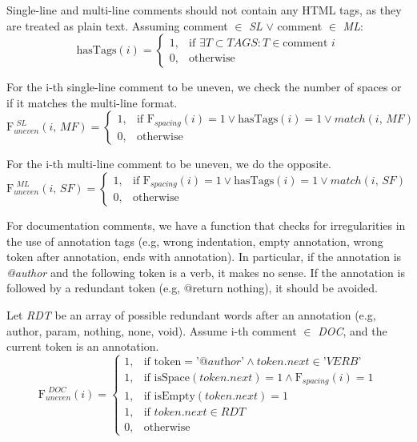 \noindent Single-line and multi-line comments should not contain any HTML tags, as they are treated as plain text.
Assuming comment $\in$ \textit{SL} $\vee$ comment $\in$ \textit{ML}:
\begin{equation*}
	\text{hasTags}(i) = \begin{cases}
		1, & \text{if } \exists T \subset TAGS : T \in \text{comment } \textit{i} \\
		0, & \text{otherwise}
	\end{cases}
\end{equation*}

\noindent For the i-th single-line comment to be uneven, we check the number of spaces or if it matches the multi-line format.
\begin{equation*}
	\mathrm{F}_{uneven}^{\textit{ SL}}(\textit{i, MF}) = \begin{cases}
		1, & \text{if } \mathrm{F}_{spacing}(i) = 1 \vee \text{hasTags}(i) = 1 \vee match(\textit{i, MF}) \\
		0, & \text{otherwise}
	\end{cases}
\end{equation*}

\noindent For the i-th multi-line comment to be uneven, we do the opposite.
\begin{equation*}
	\mathrm{F}_{uneven}^{\textit{ ML}}(\textit{i, SF}) = \begin{cases}
		1, & \text{if } \mathrm{F}_{spacing}(i) = 1 \vee \text{hasTags}(i) = 1 \vee match(\textit{i, SF}) \\
		0, & \text{otherwise}
	\end{cases}
\end{equation*}

\noindent For documentation comments, we have a function that checks for irregularities in the use of annotation tags (e.g, wrong indentation, empty annotation, wrong token after annotation, ends with annotation). In particular, if the annotation is \textit{@author} and the following token is a verb, it makes no sense. If the annotation is followed by a redundant token (e.g, @return nothing), it should be avoided.

\newpage

\noindent Let \textit{RDT} be an array of possible redundant words after an annotation (e.g, author, param, nothing, none, void).
Assume i-th comment $\in$ \textit{DOC}, and the current token is an annotation.
\begin{equation*}
	\mathrm{F}_{uneven}^{\textit{ DOC}}(i) = \begin{cases}
		1, & \text{if } \text{token} = \textit{'@author'} \wedge token.next \in \textit{'VERB'} \\
		1, & \text{if } \text{isSpace}(token.next) = 1 \wedge \mathrm{F}_{spacing}(i) = 1 \\
		1, & \text{if } \text{isEmpty}(token.next) = 1 \\
		1, & \text{if } token.next \in RDT \\
		0, & \text{otherwise}
	\end{cases}
\end{equation*}
